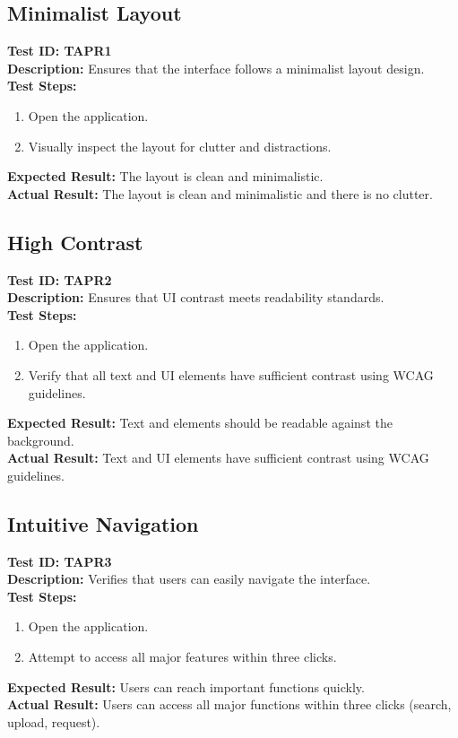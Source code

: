 \documentclass[12pt, titlepage]{article}
\begin{document}
\subsection{Minimalist Layout}
\textbf{Test ID: TAPR1}\\
\textbf{Description:} Ensures that the interface follows a minimalist layout design.\\
\textbf{Test Steps:}
\begin{enumerate}
    \item Open the application.
    \item Visually inspect the layout for clutter and distractions.
\end{enumerate}
\textbf{Expected Result:} The layout is clean and minimalistic.\\
\textbf{Actual Result:} The layout is clean and minimalistic and there is no clutter.

\subsection{High Contrast}
\textbf{Test ID: TAPR2}\\
\textbf{Description:} Ensures that UI contrast meets readability standards.\\
\textbf{Test Steps:}
\begin{enumerate}
    \item Open the application.
    \item Verify that all text and UI elements have sufficient contrast using WCAG guidelines.
\end{enumerate}
\textbf{Expected Result:} Text and elements should be readable against the background.\\
\textbf{Actual Result:} Text and UI elements have sufficient contrast using WCAG guidelines.

\subsection{Intuitive Navigation}
\textbf{Test ID: TAPR3}\\
\textbf{Description:} Verifies that users can easily navigate the interface.\\
\textbf{Test Steps:}
\begin{enumerate}
    \item Open the application.
    \item Attempt to access all major features within three clicks.
\end{enumerate}
\textbf{Expected Result:} Users can reach important functions quickly.\\
\textbf{Actual Result:} Users can access all major functions within three clicks (search, upload, request).
\end{document}
